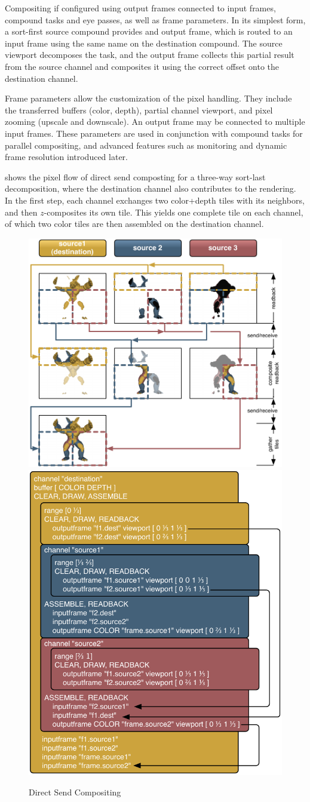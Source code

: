 Compositing if configured using output frames connected to input frames,
compound tasks and eye passes, as well as frame parameters. In its simplest
form, a sort-first source compound provides and output frame, which is routed to
an input frame using the same name on the destination compound. The source
viewport decomposes the task, and the output frame collects this partial result
from the source channel and composites it using the correct offset onto the
destination channel.

Frame parameters allow the customization of the pixel handling. They include the
transferred buffers (color, depth), partial channel viewport, and pixel zooming
(upscale and downscale). An output frame may be connected to multiple input
frames. These parameters are used in conjunction with compound tasks for
parallel compositing, and advanced features such as monitoring and dynamic frame
resolution introduced later.

 shows the pixel flow of direct send composting for a three-way
sort-last decomposition, where the destination channel also contributes to the
rendering. In the first step, each channel exchanges two color+depth tiles with
its neighbors, and then $z$-composites its own tile. This yields one complete
tile on each channel, of which two color tiles are then assembled on the
destination channel.

\begin{figure}[ht]
 \includegraphics[width=.57\textwidth]{images/directSend}
 \includegraphics[width=.42\textwidth]{images/directSendCompound}
 {\caption{\label{fDirectSend}Direct Send Compositing}}
\end{figure}

